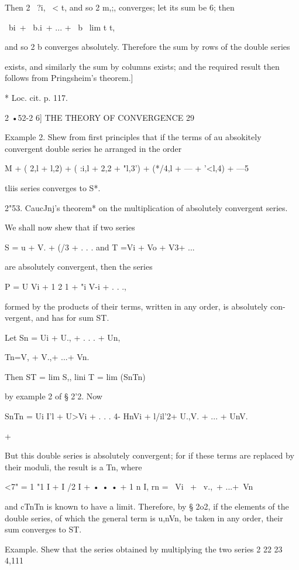 Then 2 \ ?i, \ < t, and so 2 m,;, converges; let its sum be 6;
then

\ bi\ + \ b.i\ + ... + \ b \ lim t t,

and so 2 b converges absolutely. Therefore the sum by rows of the
double series

exists, and similarly the sum by columns exists; and the required
result then follows from Pringsheim's theorem.]

* Loc. cit. p. 117.



2 •52-2 6] THE THEORY OF CONVERGENCE 29

Example 2. Shew from first principles that if the terms of au
absokitely convergent double series he arranged in the order

 M + ( 2,l + l,2) + ( :i,l + 2,2 + "l,3') + (*/4,l + --- + '<l,4) +
---5

tliis series converges to S*.

2"53. CaucJnj's theorem* on the multiplication of absolutely
convergent series.

We shall now shew that if two series

S = u + V. + (/3 + . . . and T =Vi + Vo + V3+ ...

are absolutely convergent, then the series

P = U Vi + 1 2 1 + "i V-i + . . .,

formed by the products of their terms, written in any order, is
absolutely con- vergent, and has for sum ST.

Let Sn = Ui + U., + . . . + Un,

Tn=V, + V.,+ ...+ Vn.

Then ST = lim S,, lini T = lim (SnTn)

by example 2 of § 2'2. Now

SnTn = Ui I'l + U>Vi + . . . 4- HnVi + l/il'2+ U.,V. + ... + UnV.

+

But this double series is absolutely convergent; for if these terms
are replaced by their moduli, the result is a Tn, where

<7" = 1 "1 I + I /2 I + • • • + 1 n I, rn = \ Vi \ + \ v.,\ + ...+\
Vn\,

and cTnTn is known to have a limit. Therefore, by § 2o2, if the
elements of the double series, of which the general term is u,nVn, be
taken in any order, their sum converges to ST.

Example. Shew that the series obtained by multiplying the two series 2
22 23 4,111

